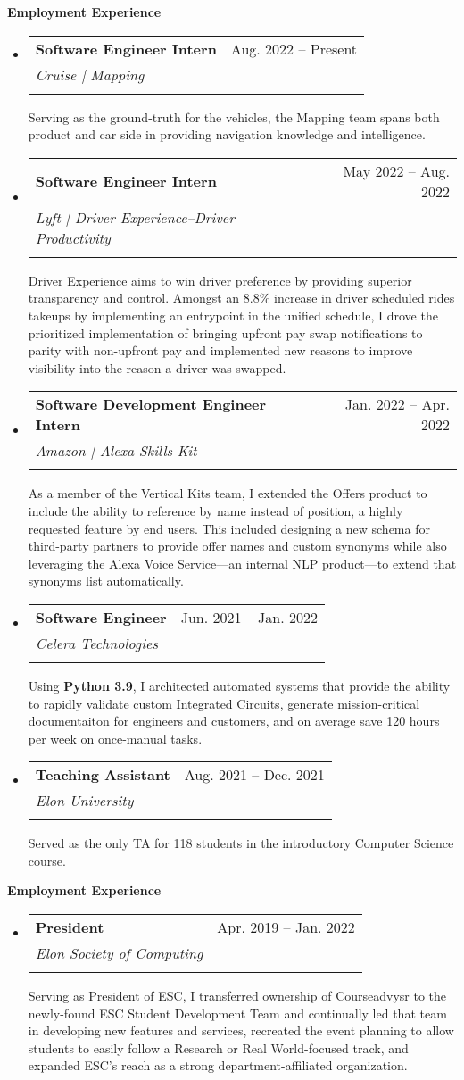 \documentclass[letterpaper,10pt,draft]{article}
\makeatletter
\newlength{\outerbordwidth}
\newcommand{\resheading}[1]{\vspace{3pt}
  {\setlength{\FrameSep}{\outerbordwidth}
    
\textbf{\large #1}
    
  }
}
\newcommand{\ressubheading}[5]{
\begin{tabular*}{6.5in}{l@{\cftdotfill{\cftsecdotsep}\extracolsep{\fill}}r}
		\textbf{#1} & #3 -- #4\\
		\textit{#2} \\\\
\end{tabular*}\vspace{-6pt}
#5
}
\makeatother
\begin{document}
\resheading{Employment Experience}
\begin{itemize}
	\item[]
		\ressubheading{Software Engineer Intern}{Cruise | Mapping}{Aug. 2022}{Present}{Serving as the ground-truth for the vehicles, the Mapping team spans both product and car side in providing navigation knowledge and intelligence.}
	\item[]
		\ressubheading{Software Engineer Intern}{Lyft | Driver Experience--Driver Productivity}{May 2022}{Aug. 2022}{Driver Experience aims to win driver preference by providing superior transparency and control. Amongst an 8.8\% increase in driver scheduled rides takeups by implementing an entrypoint in the unified schedule, I drove the prioritized implementation of bringing upfront pay swap notifications to parity with non-upfront pay and implemented new reasons to improve visibility into the reason a driver was swapped.}
	\item[]
		\ressubheading{Software Development Engineer Intern}{Amazon | Alexa Skills Kit}{Jan. 2022}{Apr. 2022}{As a member of the Vertical Kits team, I extended the Offers product to include the ability to reference by name instead of position, a highly requested feature by end users. This included designing a new schema for third-party partners to provide offer names and custom synonyms while also leveraging the Alexa Voice Service—an internal NLP product—to extend that synonyms list automatically.}
	\item[]
		\ressubheading{Software Engineer}{Celera Technologies}{Jun. 2021}{Jan. 2022}{Using \textbf{Python 3.9}, I architected automated systems that provide the ability to rapidly validate custom Integrated Circuits, generate mission-critical documentaiton for engineers and customers, and on average save 120 hours per week on once-manual tasks.}
	\item[]
		\ressubheading{Teaching Assistant}{Elon University}{Aug. 2021}{Dec. 2021}{Served as the only TA for 118 students in the introductory Computer Science course.}
\end{itemize}

\resheading{Employment Experience}
\begin{itemize}
	\item[]
		\ressubheading{President}{Elon Society of Computing}{Apr. 2019}{Jan. 2022}{Serving as President of ESC, I transferred ownership of Courseadvysr to the newly-found ESC Student Development Team and continually led that team in developing new features and services, recreated the event planning to allow students to easily follow a Research or Real World-focused track, and expanded ESC’s reach as a strong department-affiliated organization.}
\end{itemize}
\end{document}

